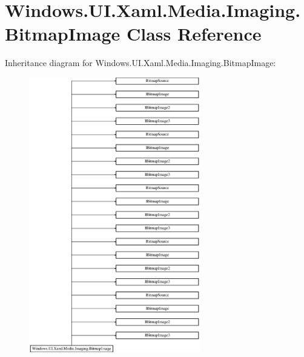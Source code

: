 \hypertarget{class_windows_1_1_u_i_1_1_xaml_1_1_media_1_1_imaging_1_1_bitmap_image}{}\section{Windows.\+U\+I.\+Xaml.\+Media.\+Imaging.\+Bitmap\+Image Class Reference}
\label{class_windows_1_1_u_i_1_1_xaml_1_1_media_1_1_imaging_1_1_bitmap_image}
Inheritance diagram for Windows.\+U\+I.\+Xaml.\+Media.\+Imaging.\+Bitmap\+Image\+:\begin{figure}[H]
\begin{center}
\leavevmode
\includegraphics[height=12.000000cm]{class_windows_1_1_u_i_1_1_xaml_1_1_media_1_1_imaging_1_1_bitmap_image}
\end{center}
\end{figure}
